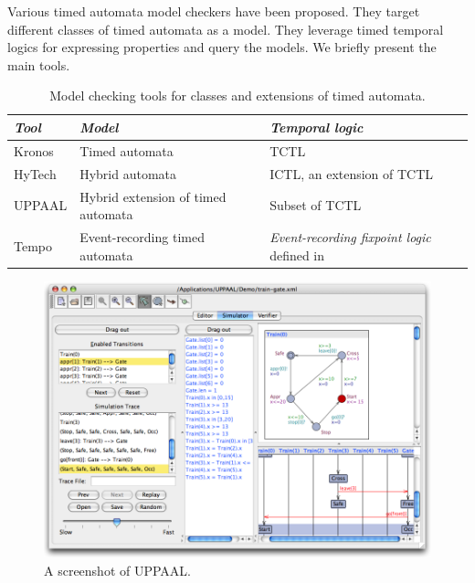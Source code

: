 Various timed automata model checkers have been proposed. They target different classes of timed automata as a model. They leverage timed temporal logics for expressing properties and query the models. We briefly present the main tools.\\

\begin{table}[htbp]
\footnotesize
\centering
\begin{tabular}{|p{4cm}|p{4cm}|p{4cm}|}

	\hline

	\textit{Tool} &
	\textit{Model} &
	\textit{Temporal logic} \\
	
	\hline
	
	Kronos \cite{KRONOS1,KRONOS2} &
	Timed automata &
	TCTL \\
	
	\hline
	
	HyTech \cite{HYTECH} &
	Hybrid automata \cite{ACHH93,alur97symbolic}  &
	ICTL, an extension of TCTL \cite{ACHH93} \\
	
	\hline
	
	UPPAAL \cite{UPPAAL} &
	Hybrid extension of timed automata &
	Subset of TCTL \\
	
	\hline
	
	Tempo \cite{MS01} &
	Event-recording timed automata &
	\emph{Event-recording fixpoint logic} defined in \cite{MS01} \\
	
	\hline

\end{tabular}
\label{tab:ta-model-checkers}
\caption{Model checking tools for classes and extensions of timed automata.}
\end{table}

\begin{figure}[htbp]
    \centering
    \includegraphics[width=\textwidth]{content/timed-automata/uppaal-2}
    \caption{A screenshot of UPPAAL.}
    \label{fig:uppaal}
\end{figure}

